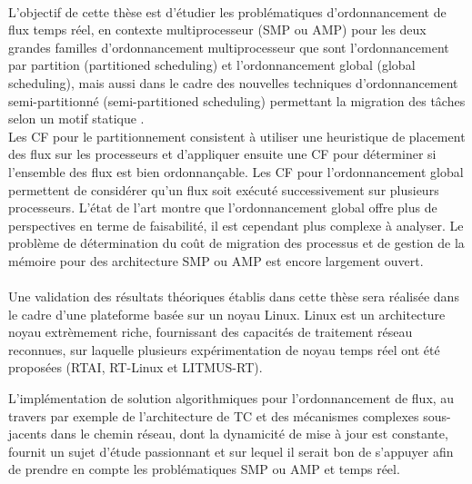 \paragraph{}
L'objectif de cette thèse est d'étudier les problématiques d'ordonnancement de flux temps réel,
en contexte multiprocesseur (SMP ou AMP) pour les deux grandes familles d'ordonnancement
multiprocesseur que sont l'ordonnancement par partition (partitioned scheduling) et l'ordonnancement
global (global scheduling), mais aussi dans le cadre des nouvelles techniques
d'ordonnancement semi-partitionné (semi-partitioned scheduling) permettant la
migration des tâches selon un motif statique \cite{sempart}.\\
%
Les CF pour le partitionnement consistent à utiliser une heuristique de placement
des flux sur les processeurs et d'appliquer ensuite une CF pour déterminer si l'ensemble
des flux est bien ordonnançable. Les CF pour l'ordonnancement global permettent
de considérer qu'un flux soit exécuté successivement sur plusieurs processeurs. L'état de l'art montre
que l'ordonnancement global offre plus de perspectives en terme de faisabilité, il est
cependant plus complexe à analyser. Le problème de détermination du coût de migration
des processus et de gestion de la mémoire pour des architecture SMP ou AMP est encore
largement ouvert.
\paragraph{}

Une validation des résultats théoriques établis dans cette thèse sera réalisée dans
le cadre d'une plateforme basée sur un noyau Linux. Linux est un architecture noyau
extrèmement riche, fournissant des capacités de traitement réseau reconnues, sur
laquelle plusieurs expérimentation de noyau temps réel ont été proposées (RTAI, RT-Linux et LITMUS-RT).

L'implémentation de solution algorithmiques pour l'ordonnancement de flux, au travers
par exemple de l'architecture de TC et des mécanismes complexes sous-jacents dans
le chemin réseau, dont la dynamicité de mise à jour est constante, fournit un sujet
d'étude passionnant et sur lequel il serait bon de s'appuyer afin de prendre en
compte les problématiques SMP ou AMP et temps réel.


